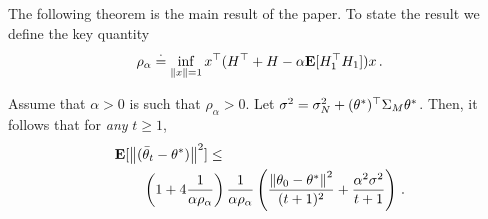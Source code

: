 The following theorem is the main result of the paper.
To state the result we define the key quantity
\begin{align}
\label{eq:rhodef}
\rho_\alpha\stackrel{\cdot}{=} \inf_{\left\| x\right\|=1} x^\top (H^\top+H-\alpha\mathbf{E}[ H_1^\top H_1] )x\,.
\end{align}
\begin{theorem}\label{maintheorem}
Assume that $\alpha>0$ is such that $\rho_\alpha>0$. Let $\sigma^2 = \sigma_N^2 + (\theta^*)^\top \Sigma_M \theta^*$.
Then, it follows that for \emph{any} $t\ge 1$, 
\begin{align}
\begin{split}
\MoveEqLeft\E[\norm{(\tb_t-\ts)}^2]\leq \\
&\left(1+4\frac1{\alpha\rho_{\alpha}}\right) \frac{1}{\alpha\rho_{\alpha}}
 \left(\frac{\norm{\theta_0-\ts}^2}{(t+1)^2}+\frac{\alpha^2\sigma^2}{t+1} \right)\,.
\end{split}
\end{align}
\end{theorem}
